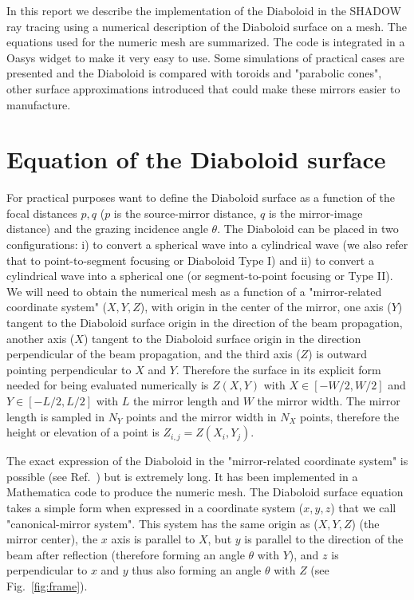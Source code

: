 \documentclass[a4paper, 11pt]{article}
\begin{document}
In this report we describe the implementation of the Diaboloid in the SHADOW \cite{codeSHADOW} ray tracing using a numerical description of the Diaboloid surface on a mesh. The equations used for the numeric mesh are summarized. The code is integrated in a Oasys \cite{codeOASYS} widget to make it very easy to use. Some simulations of practical cases are presented and the Diaboloid is compared with toroids and "parabolic cones", other surface approximations introduced that could make these mirrors easier to manufacture. 

\section{Equation of the Diaboloid surface}
\label{sec:DiaboloidEqs}

For practical purposes want to define the Diaboloid surface as a function of the focal distances $p,q$ ($p$ is the source-mirror distance, $q$ is the mirror-image distance) and the grazing incidence angle $\theta$. The Diaboloid can be placed in two configurations: i) to convert a spherical wave into a cylindrical wave (we also refer that to point-to-segment focusing or Diaboloid Type I) and ii) to convert a cylindrical wave into a spherical one (or segment-to-point focusing or Type II). We will need to obtain the numerical mesh as a function of a "mirror-related coordinate system" ($X,Y,Z$), with origin in the center of the mirror, one axis ($Y$) tangent to the Diaboloid surface origin in the direction of the beam propagation, another axis ($X$) tangent to the Diaboloid surface origin in the direction perpendicular of the beam propagation, and the third axis ($Z$) is outward pointing perpendicular to $X$ and $Y$. Therefore the surface in its explicit form needed for being evaluated numerically is $Z(X,Y)$ with $X \in [-W/2, W/2]$ and $Y \in [-L/2, L/2]$ with $L$ the mirror length and $W$ the mirror width. The mirror length is sampled in $N_Y$ points and the mirror width in $N_X$ points, therefore the height or elevation of a point is $Z_{i,j}=Z(X_i,Y_j)$.

The exact expression of the Diaboloid in the "mirror-related coordinate system" is possible (see Ref.~\cite{Valeriy2020b}) but is extremely long. It has been implemented in a Mathematica code \cite{lacey} to produce the numeric mesh. The Diaboloid surface equation takes a simple form when expressed in a coordinate system ($x,y,z$) that we call "canonical-mirror system". This system has the same origin as ($X,Y,Z$) (the mirror center), the $x$ axis is parallel to $X$, but $y$ is parallel to the direction of the beam after reflection (therefore forming an angle $\theta$ with $Y$), and $z$ is perpendicular to $x$ and $y$ thus also forming an angle $\theta$ with $Z$ (see Fig.~\ref{fig:frame}).
\end{document}
